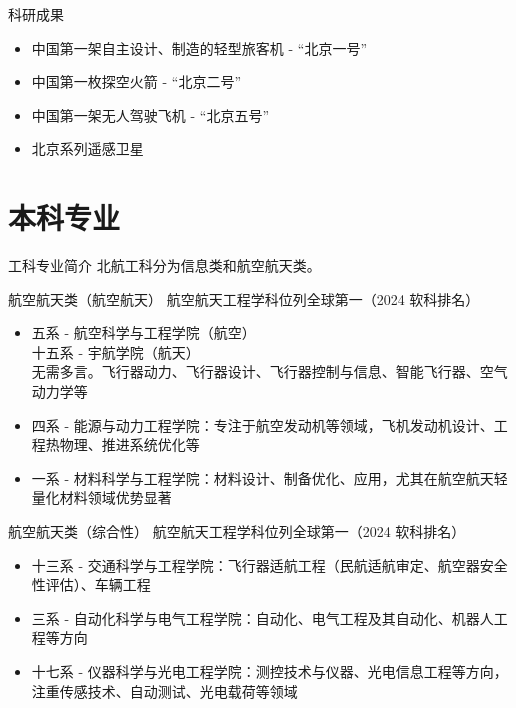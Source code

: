 \documentclass[
    12pt,
    aspectratio=169
]{beamer}
\begin{document}
\begin{frame}{科研成果}
    \begin{itemize}[<+->]
        \item \rmfamily 中国第一架自主设计、制造的轻型旅客机 - “北京一号”
        \item \rmfamily 中国第一枚探空火箭 - “北京二号”
        \item \rmfamily 中国第一架无人驾驶飞机 - “北京五号”
        \item \rmfamily 北京系列遥感卫星
    \end{itemize} 
\end{frame}

\section{本科专业}

\begin{frame}{工科专业简介}
    北航工科分为信息类和航空航天类。
\end{frame}

\begin{frame}{航空航天类（航空航天）}
    航空航天工程学科位列全球第一‌‌（2024 软科排名）
    \begin{itemize}[<+->]
        \item   \srfamily 五系 - 航空科学与工程学院（航空）\\
                \srfamily 十五系 - 宇航学院（航天）\\
                \ttfamily 无需多言。飞行器动力、飞行器设计、飞行器控制与信息、‌智能飞行器、空气动力学等
        \item \srfamily 四系 - 能源与动力工程学院：\ttfamily 专注于航空发动机等领域，飞机发动机设计、工程热物理、推进系统优化等
        \item \srfamily 一系 - 材料科学与工程学院：\ttfamily 材料设计、制备优化、应用，尤其在航空航天轻量化材料领域优势显著
    \end{itemize}
\end{frame}

\begin{frame}{航空航天类（综合性）}
    航空航天工程学科位列全球第一‌‌（2024 软科排名）
    \begin{itemize}[<+->]
        \item \srfamily 十三系 - 交通科学与工程学院：\ttfamily 飞行器适航工程（民航适航审定、航空器安全性评估）、车辆工程
        \item \srfamily 三系 - 自动化科学与电气工程学院：\ttfamily 自动化、电气工程及其自动化、机器人工程等方向
        \item \srfamily 十七系 - 仪器科学与光电工程学院：\ttfamily 测控技术与仪器、‌光电信息工程‌等方向，注重传感技术、自动测试、光电载荷等领域
    \end{itemize}
\end{frame}
\end{document}
